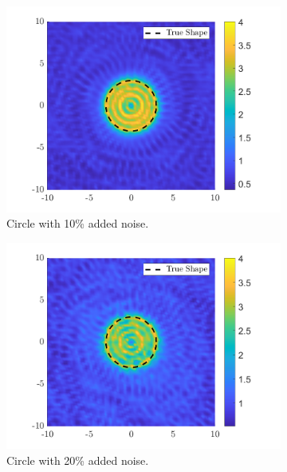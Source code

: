 \documentclass[]{article}
\begin{document}
			\begin{figure}[h]
				\centering
				\begin{subfigure}{.3\textwidth}
					\centering
					\includegraphics[width = \textwidth]{Numeric Simulations/Images/circle-10-noise-reconstructed}
					\caption{Circle with 10\% added noise.}
				\end{subfigure}
				\begin{subfigure}{.3\textwidth}
					\centering
					\includegraphics[width = \textwidth]{Numeric Simulations/Images/circle-20-noise-reconstructed}
					\caption{Circle with 20\% added noise.}
				\end{subfigure}
				\begin{subfigure}{.3\textwidth}

\end{subfigure}
\end{figure}
\end{document}
